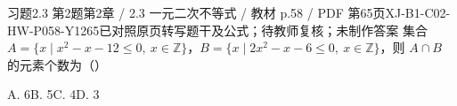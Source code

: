\par\noindent\begin{minipage}{\linewidth}
\begin{bankitem}{习题2.3 第2题}{第2章 / 2.3 一元二次不等式 / 教材 p.58 / PDF 第65页}{XJ-B1-C02-HW-P058-Y1265}{已对照原页转写题干及公式；待教师复核；未制作答案}
集合 $A=\{x\mid x^2-x-12\le0,\ x\in\mathbb Z\}$，$B=\{x\mid2x^2-x-6\le0,\ x\in\mathbb Z\}$，则 $A\cap B$ 的元素个数为（\quad）
\par A. 6\qquad B. 5\qquad C. 4\qquad D. 3
\end{bankitem}
\end{minipage}\par\medskip
